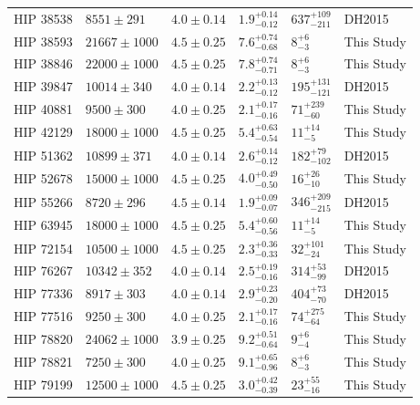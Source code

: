 \documentclass{emulateapj}
\begin{document}
\begin{longtable*}{|l|lllll|}
  HIP 38538 &    $8551 \pm 291$ &  $4.0 \pm 0.14$ &  $1.9^{+0.14}_{-0.12}$ &  $637^{+109}_{-211}$ &      DH2015 \\
  HIP 38593 &  $21667 \pm 1000$ &  $4.5 \pm 0.25$ &  $7.6^{+0.74}_{-0.68}$ &        $8^{+6}_{-3}$ &  This Study \\
  HIP 38846 &  $22000 \pm 1000$ &  $4.5 \pm 0.25$ &  $7.8^{+0.74}_{-0.71}$ &        $8^{+6}_{-3}$ &  This Study \\
  HIP 39847 &   $10014 \pm 340$ &  $4.0 \pm 0.14$ &  $2.2^{+0.13}_{-0.12}$ &  $195^{+131}_{-121}$ &      DH2015 \\
  HIP 40881 &    $9500 \pm 300$ &  $4.0 \pm 0.25$ &  $2.1^{+0.17}_{-0.16}$ &    $71^{+239}_{-60}$ &  This Study \\
  HIP 42129 &  $18000 \pm 1000$ &  $4.5 \pm 0.25$ &  $5.4^{+0.63}_{-0.54}$ &      $11^{+14}_{-5}$ &  This Study \\
  HIP 51362 &   $10899 \pm 371$ &  $4.0 \pm 0.14$ &  $2.6^{+0.14}_{-0.12}$ &   $182^{+79}_{-102}$ &      DH2015 \\
  HIP 52678 &  $15000 \pm 1000$ &  $4.5 \pm 0.25$ &  $4.0^{+0.49}_{-0.50}$ &     $16^{+26}_{-10}$ &  This Study \\
  HIP 55266 &    $8720 \pm 296$ &  $4.5 \pm 0.14$ &  $1.9^{+0.09}_{-0.07}$ &  $346^{+209}_{-215}$ &      DH2015 \\
  HIP 63945 &  $18000 \pm 1000$ &  $4.5 \pm 0.25$ &  $5.4^{+0.60}_{-0.56}$ &      $11^{+14}_{-5}$ &  This Study \\
  HIP 72154 &  $10500 \pm 1000$ &  $4.5 \pm 0.25$ &  $2.3^{+0.36}_{-0.33}$ &    $32^{+101}_{-24}$ &  This Study \\
  HIP 76267 &   $10342 \pm 352$ &  $4.0 \pm 0.14$ &  $2.5^{+0.19}_{-0.16}$ &    $314^{+53}_{-99}$ &      DH2015 \\
  HIP 77336 &    $8917 \pm 303$ &  $4.0 \pm 0.14$ &  $2.9^{+0.23}_{-0.20}$ &    $404^{+73}_{-70}$ &      DH2015 \\
  HIP 77516 &    $9250 \pm 300$ &  $4.0 \pm 0.25$ &  $2.1^{+0.17}_{-0.16}$ &    $74^{+275}_{-64}$ &  This Study \\
  HIP 78820 &  $24062 \pm 1000$ &  $3.9 \pm 0.25$ &  $9.2^{+0.51}_{-0.64}$ &        $9^{+6}_{-4}$ &  This Study \\
  HIP 78821 &    $7250 \pm 300$ &  $4.0 \pm 0.25$ &  $9.1^{+0.65}_{-0.96}$ &        $8^{+6}_{-3}$ &  This Study \\
  HIP 79199 &  $12500 \pm 1000$ &  $4.5 \pm 0.25$ &  $3.0^{+0.42}_{-0.39}$ &     $23^{+55}_{-16}$ &  This Study \\

\end{longtable*}
\end{document}
